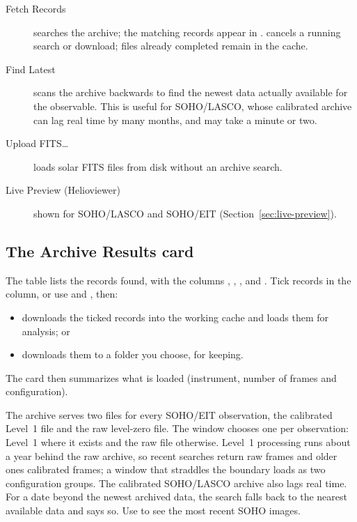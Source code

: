 \begin{description}
  \item[Fetch Records] searches the archive; the matching records appear in
    .  cancels a running search or download; files already
    completed remain in the cache.
  \item[Find Latest] scans the archive backwards to find the newest data actually available
    for the observable. This is useful for SOHO/LASCO, whose calibrated archive can lag real
    time by many months, and may take a minute or two.
  \item[Upload FITS…] loads solar FITS files from disk without an archive search.
  \item[Live Preview (Helioviewer)] shown for SOHO/LASCO and SOHO/EIT
    (Section~\ref{sec:live-preview}).
\end{description}

\subsection{The Archive Results card}
\label{sec:archive-results}

The  table lists the records found, with the columns ,
, ,  and . Tick records in the 
column, or use  and , then:
\begin{itemize}
  \item {} downloads the ticked records into the working cache and loads
    them for analysis; or
  \item {} downloads them to a folder you choose, for keeping.
\end{itemize}
The  card then summarizes what is loaded (instrument, number of frames and
configuration).

\begin{note}
  The archive serves two files for every SOHO/EIT observation, the calibrated Level~1 file
  and the raw level-zero file. The window chooses one per observation: Level~1 where it
  exists and the raw file otherwise. Level~1 processing runs about a year behind the raw
  archive, so recent searches return raw frames and older ones calibrated frames; a window
  that straddles the boundary loads as two configuration groups. The calibrated SOHO/LASCO
  archive also lags real time. For a date beyond the newest archived data, the search falls
  back to the nearest available data and says so. Use  to see the most
  recent SOHO images.
\end{note}

